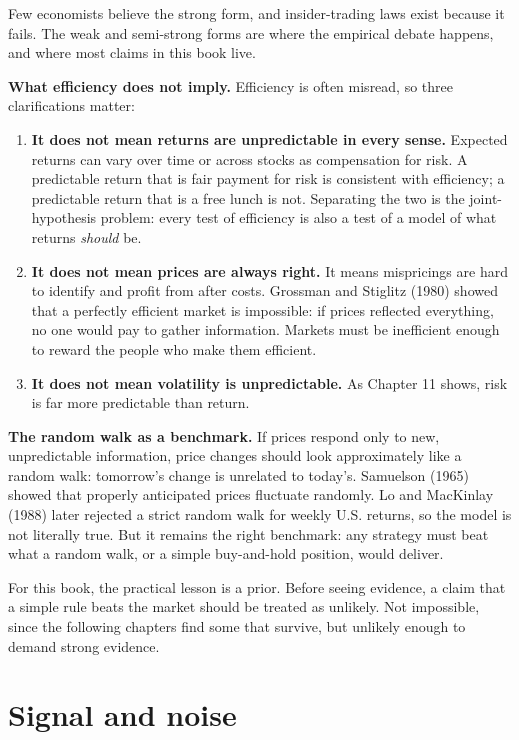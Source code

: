 Few economists believe the strong form, and insider-trading laws exist because it fails. The weak and semi-strong forms are where the empirical debate happens, and where most claims in this book live.

\textbf{What efficiency does not imply.} Efficiency is often misread, so three clarifications matter:

\begin{enumerate}
  \item \textbf{It does not mean returns are unpredictable in every sense.} Expected returns can vary over time or across stocks as compensation for risk. A predictable return that is fair payment for risk is consistent with efficiency; a predictable return that is a free lunch is not. Separating the two is the joint-hypothesis problem: every test of efficiency is also a test of a model of what returns \emph{should} be.
  \item \textbf{It does not mean prices are always right.} It means mispricings are hard to identify and profit from after costs. Grossman and Stiglitz (1980) showed that a perfectly efficient market is impossible: if prices reflected everything, no one would pay to gather information. Markets must be inefficient enough to reward the people who make them efficient.
  \item \textbf{It does not mean volatility is unpredictable.} As Chapter 11 shows, risk is far more predictable than return.
\end{enumerate}

\textbf{The random walk as a benchmark.} If prices respond only to new, unpredictable information, price changes should look approximately like a random walk: tomorrow's change is unrelated to today's. Samuelson (1965) showed that properly anticipated prices fluctuate randomly. Lo and MacKinlay (1988) later rejected a strict random walk for weekly U.S. returns, so the model is not literally true. But it remains the right benchmark: any strategy must beat what a random walk, or a simple buy-and-hold position, would deliver.

For this book, the practical lesson is a prior. Before seeing evidence, a claim that a simple rule beats the market should be treated as unlikely. Not impossible, since the following chapters find some that survive, but unlikely enough to demand strong evidence.

\section{Signal and noise}
\label{sec:01-signal-noise}

